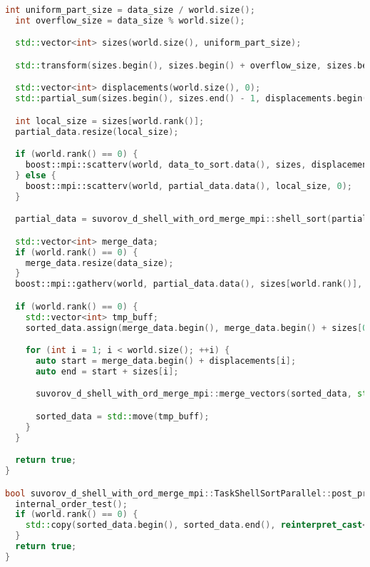 \documentclass{report}
\begin{document}
\begin{lstlisting}[language=C++, caption={Реализация}]
  int uniform_part_size = data_size / world.size();
  int overflow_size = data_size % world.size();

  std::vector<int> sizes(world.size(), uniform_part_size);

  std::transform(sizes.begin(), sizes.begin() + overflow_size, sizes.begin(), [](int size) { return size + 1; });

  std::vector<int> displacements(world.size(), 0);
  std::partial_sum(sizes.begin(), sizes.end() - 1, displacements.begin() + 1);

  int local_size = sizes[world.rank()];
  partial_data.resize(local_size);

  if (world.rank() == 0) {
    boost::mpi::scatterv(world, data_to_sort.data(), sizes, displacements, partial_data.data(), local_size, 0);
  } else {
    boost::mpi::scatterv(world, partial_data.data(), local_size, 0);
  }

  partial_data = suvorov_d_shell_with_ord_merge_mpi::shell_sort(partial_data);

  std::vector<int> merge_data;
  if (world.rank() == 0) {
    merge_data.resize(data_size);
  }
  boost::mpi::gatherv(world, partial_data.data(), sizes[world.rank()], merge_data.data(), sizes, displacements, 0);

  if (world.rank() == 0) {
    std::vector<int> tmp_buff;
    sorted_data.assign(merge_data.begin(), merge_data.begin() + sizes[0]);

    for (int i = 1; i < world.size(); ++i) {
      auto start = merge_data.begin() + displacements[i];
      auto end = start + sizes[i];

      suvorov_d_shell_with_ord_merge_mpi::merge_vectors(sorted_data, std::vector<int>(start, end), tmp_buff);

      sorted_data = std::move(tmp_buff);
    }
  }

  return true;
}

bool suvorov_d_shell_with_ord_merge_mpi::TaskShellSortParallel::post_processing() {
  internal_order_test();
  if (world.rank() == 0) {
    std::copy(sorted_data.begin(), sorted_data.end(), reinterpret_cast<int*>(taskData->outputs[0]));
  }
  return true;
}
\end{lstlisting}
    
\end{document}
